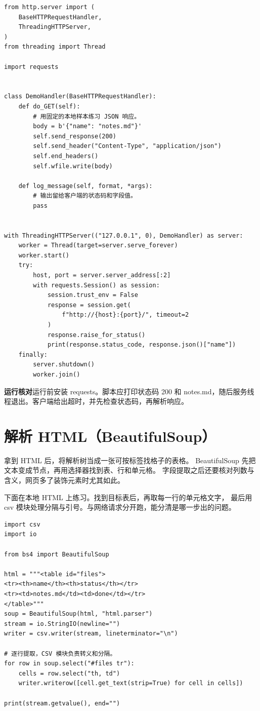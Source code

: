 \begin{lstlisting}[title={\code{local_http.py}}]
from http.server import (
    BaseHTTPRequestHandler,
    ThreadingHTTPServer,
)
from threading import Thread

import requests


class DemoHandler(BaseHTTPRequestHandler):
    def do_GET(self):
        # 用固定的本地样本练习 JSON 响应。
        body = b'{"name": "notes.md"}'
        self.send_response(200)
        self.send_header("Content-Type", "application/json")
        self.end_headers()
        self.wfile.write(body)

    def log_message(self, format, *args):
        # 输出留给客户端的状态码和字段值。
        pass


with ThreadingHTTPServer(("127.0.0.1", 0), DemoHandler) as server:
    worker = Thread(target=server.serve_forever)
    worker.start()
    try:
        host, port = server.server_address[:2]
        with requests.Session() as session:
            session.trust_env = False
            response = session.get(
                f"http://{host}:{port}/", timeout=2
            )
            response.raise_for_status()
            print(response.status_code, response.json()["name"])
    finally:
        server.shutdown()
        worker.join()
\end{lstlisting}

\textbf{运行核对}\enspace 运行前安装 requests。脚本应打印状态码 200 和 notes.md，随后服务线程退出。客户端给出超时，并先检查状态码，再解析响应。

\section[解析 HTML]{解析 HTML（BeautifulSoup）}

拿到 HTML 后，将解析树当成一张可按标签找格子的表格。
BeautifulSoup 先把文本变成节点，再用选择器找到表、行和单元格。
字段提取之后还要核对列数与含义，网页多了装饰元素时尤其如此。

下面在本地 HTML 上练习。找到目标表后，再取每一行的单元格文字，
最后用 csv 模块处理分隔与引号。与网络请求分开跑，能分清是哪一步出的问题。


\begin{lstlisting}[title={\code{extract_table.py}}]
import csv
import io

from bs4 import BeautifulSoup

html = """<table id="files">
<tr><th>name</th><th>status</th></tr>
<tr><td>notes.md</td><td>done</td></tr>
</table>"""
soup = BeautifulSoup(html, "html.parser")
stream = io.StringIO(newline="")
writer = csv.writer(stream, lineterminator="\n")

# 逐行提取，CSV 模块负责转义和分隔。
for row in soup.select("#files tr"):
    cells = row.select("th, td")
    writer.writerow([cell.get_text(strip=True) for cell in cells])

print(stream.getvalue(), end="")
\end{lstlisting}



